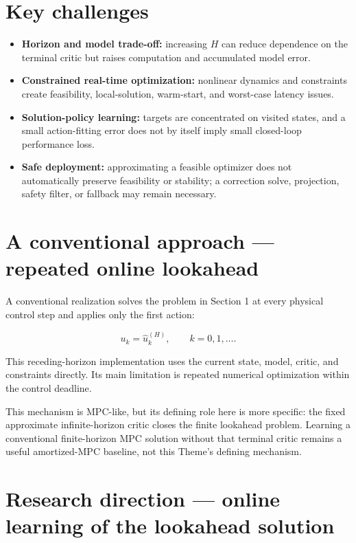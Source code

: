 \documentclass[a4paper]{article}
\begin{document}
\section{Key challenges}

\begin{itemize}
  \item \textbf{Horizon and model trade-off:} increasing $H$ can reduce dependence on the
  terminal critic but raises computation and accumulated model error.
  \item \textbf{Constrained real-time optimization:} nonlinear dynamics and constraints
  create feasibility, local-solution, warm-start, and worst-case latency
  issues.
  \item \textbf{Solution-policy learning:} targets are concentrated on visited states,
  and a small action-fitting error does not by itself imply small closed-loop
  performance loss.
  \item \textbf{Safe deployment:} approximating a feasible optimizer does not
  automatically preserve feasibility or stability; a correction solve,
  projection, safety filter, or fallback may remain necessary.
\end{itemize}

\section{A conventional approach — repeated online lookahead}

A conventional realization solves the problem in Section 1 at every physical
control step and applies only the first action:

\begin{equation}
  u_k=\widehat u_k^{(H)},
  \qquad
  k=0,1,\ldots .
\end{equation}

This receding-horizon implementation uses the current state, model, critic,
and constraints directly. Its main limitation is repeated numerical
optimization within the control deadline.

This mechanism is MPC-like, but its defining role here is more specific: the
fixed approximate infinite-horizon critic closes the finite lookahead problem.
Learning a conventional finite-horizon MPC solution without that terminal
critic remains a useful amortized-MPC baseline, not this Theme's defining
mechanism.

\section{Research direction — online learning of the lookahead solution}
\end{document}
